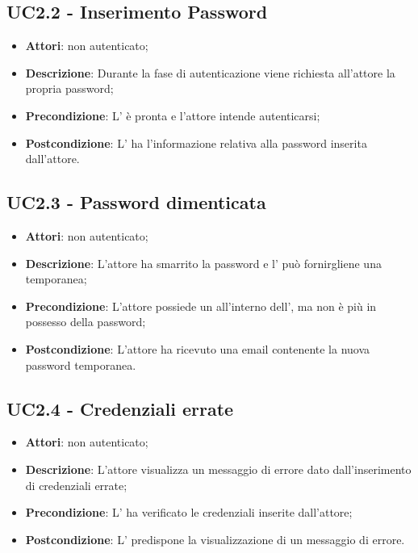 \subsection{UC2.2 - Inserimento Password}
\label{ssec:UC2.2}
\begin{itemize}
\item \textbf{Attori}:  non autenticato;
\item \textbf{Descrizione}: Durante la fase di autenticazione viene richiesta all'attore la propria password;
\item \textbf{Precondizione}: L' è pronta e l'attore intende autenticarsi;
\item \textbf{Postcondizione}: L' ha l’informazione relativa alla password inserita dall’attore.
\end{itemize}
\subsection{UC2.3 - Password dimenticata}
\label{ssec:UC2.3}
\begin{itemize}
\item \textbf{Attori}:  non autenticato;
\item \textbf{Descrizione}: L'attore ha smarrito la password e l' può fornirgliene una temporanea;
\item \textbf{Precondizione}: L'attore possiede un  all'interno dell', ma non è più in possesso della password;
\item \textbf{Postcondizione}: L'attore ha ricevuto una email contenente la nuova password temporanea.
\end{itemize}
\subsection{UC2.4 - Credenziali errate}
\label{ssec:UC2.4}
\begin{itemize}
\item \textbf{Attori}:  non autenticato;
\item \textbf{Descrizione}: L’attore visualizza un messaggio di errore dato dall’inserimento di credenziali errate;
\item \textbf{Precondizione}: L' ha verificato le credenziali inserite dall’attore;
\item \textbf{Postcondizione}: L' predispone la visualizzazione di un messaggio di errore.
\end{itemize}
